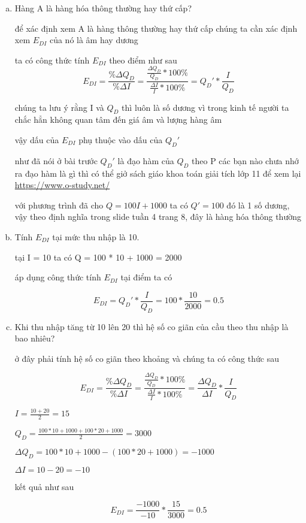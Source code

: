 \begin{enumerate}[a.]
  \item Hàng A là hàng hóa thông thường hay thứ cấp?

        để xác định xem A là hàng thông thường hay thứ cấp
        chúng ta cần xác định xem $E_{DI}$ của nó là âm hay dương

        ta có công thức tính $E_{DI}$ theo điểm như sau
        \[ E_{DI} =
          \frac{\% \Delta Q_D}{\% \Delta I}
          = \frac{\frac{\Delta Q_D}{Q_D} * 100 \% }{\frac{\Delta I}{I} * 100 \% }
          = Q_D' * \frac{I}{Q_D}
        \]

        chúng ta lưu ý rằng I và $Q_D$ thì luôn là số dương vì trong kinh tế người ta chắc hẳn không quan tâm đến giá âm và lượng hàng âm

        vậy dấu của $E_{DI}$ phụ thuộc vào dấu của $Q_D'$

        như đã nói ở bài trước $Q_D'$ là đạo hàm của $Q_D$ theo P
        các bạn nào chưa nhớ ra đạo hàm là gì thì có thể giở sách giáo khoa toán giải tích lớp 11 để xem lại
        \url{https://www.o-study.net/}

        với phương trình đã cho $Q = 100I + 1000$ ta có $Q' = 100$
        đó là 1 số dương, vậy theo định nghĩa trong slide tuần 4 trang 8, đây là hàng hóa thông thường


  \item Tính $E_{DI}$ tại mức thu nhập là 10.

        tại I = 10 ta có Q = 100 * 10 + 1000 = 2000

        áp dụng công thức tính $E_{DI}$  tại điểm ta có

        \[ E_{DI} =
          Q_D' * \frac{I}{Q_D}
          = 100 * \frac{10}{2000}
          = 0.5
        \]

  \item  Khi thu nhập tăng từ 10 lên 20 thì hệ số co giãn của cầu theo thu nhập là bao nhiêu?

        ở đây phải tính hệ số co giãn theo khoảng
        và chúng ta có công thức sau

        \[ E_{DI} =
          \frac{\% \Delta Q_D}{\% \Delta I}
          = \frac{\frac{\Delta Q_D}{Q_D} * 100 \% }{\frac{\Delta I}{I} * 100 \% }
          = \frac{\Delta Q_D}{\Delta I} * \frac{I}{Q_D}
        \]

        $ I = \frac{10 + 20}{2} = 15$

        $ Q_D = \frac{100 * 10 + 1000 + 100 * 20 + 1000}{2} = 3000$

        $\Delta Q_D = 100 * 10 + 1000 - (100 * 20 + 1000) = -1000$

        $\Delta I = 10 - 20 = -10$

        kết quả như sau

        \[ E_{DI} = \frac{-1000}{-10} * \frac{15}{3000} = 0.5  \]

\end{enumerate}

